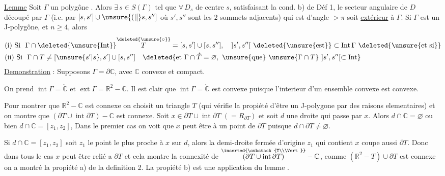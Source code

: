 \uline{Lemme} Soit $\Gamma$ un polygône  . Alors $\exists\,s\in S(\Gamma)$  tel que $\forall\,D_s$ de centre $s$,  satisfaisant la cond. b) de Déf 1, le secteur angulaire de $D$ découpé par $\Gamma$ (i.e. par $[s,s']\cup\unsure{(|[}s,s'']$ où $s',s''$ sont les $2$ sommets adjacents) qui est d'angle $>\pi$ soit \uline{extérieur} à $\Gamma$. Si $\Gamma$ est un J-polygône, et $n\ge4$, alors
\[
\begin{aligned}
&\text{(i) Si }\ \Gamma\cap\deleted{\unsure{\operatorname{Int}}}\overset{\deleted{\unsure{\circ}}}{T}=[s,s']\cup[s,s''],\quad ]s',s''[\ \deleted{\unsure{\text{est}}}\subset\operatorname{Int}\Gamma\ \text{\deleted{\unsure{et si}}}\\
&\text{(ii) Si }\ \Gamma\cap T\ne[\unsure{s'|s},s']\cup[s,s'']\quad
\deleted{\text{et }\Gamma\cap\mathring{T}=\varnothing,\ \unsure{\text{que}}\ \unsure{\Gamma\cap T}\ ]s',s''[\subset\operatorname{Int}}
\end{aligned}
\]
\uline{Demonstration} : Supposons $\Gamma=\partial\mathbb{C}$, avec $\mathbb{C}$ convexe et compact.

On prend $\operatorname{int}\Gamma=\mathring{\mathbb{C}}$ et $\operatorname{ext}\Gamma=\mathbb{R}^{2}-\mathbb{C}$. Il est clair que $\operatorname{int}\Gamma=\mathring{\mathbb{C}}$ est convexe puisque l'interieur d'un ensemble convexe est convexe.

Pour montrer que $\mathbb{R}^{2}-\mathbb{C}$ est connexe on choisit un triangle $T$ (qui vérifie la propiété d'être un J-polygone par des raisons elementaires) et on montre que $(\partial T\cup\operatorname{int}\partial T)-\mathbb{C}$ est connexe. Soit $x\in\partial T\cup\operatorname{int}\partial T$  $(=R_{\partial T})$  et soit $d$ une droite qui passe par $x$. Alors $d\cap\mathbb{C}=\varnothing$ ou bien $d\cap\mathbb{C}=[z_1,z_2]$, Dans le premier cas on voit que $x$ peut être  à un point de $\partial T$ puisque $d\cap\partial T\ne\varnothing$.

Si $d\cap\mathbb{C}=[z_1,z_2]$ soit $z_1$ le point  le plus proche à $x$ sur $d$, alors la demi-droite fermée d'origine $z_1$ qui contient $x$ coupe aussi $\partial T$. Donc dans tous le cas $x$ peut être relié a $\partial T$ et cela montre la connexité de $\overset{\inserted{\substack{T\\\Vert}}}{(\partial T\cup\operatorname{int}\partial T)}-\mathbb{C}$, comme $(\mathbb{R}^{2}-T)\cup\partial T$ est connexe  on a montré la propiété a) de la definition 2. La propiété b) est une application  du lemme .

